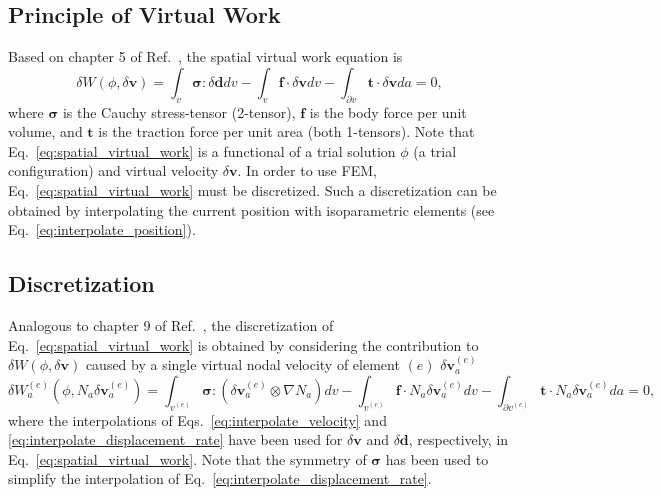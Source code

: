 \subsection{Principle of Virtual Work} 

Based on chapter 5 of Ref.\ \cite{JavierBonet:2008uxa}, the spatial virtual work equation is
%
\begin{equation}
\delta W(\phi,\delta \pmb{v}) = \int_v \pmb{\sigma}:\delta \pmb{d} dv - \int_v \pmb{f} \cdot \delta\pmb{v}dv - \int_{\partial v} \pmb{t} \cdot \delta \pmb{v} da = 0,
\label{eq:spatial_virtual_work}
\end{equation}
%
where $\pmb{\sigma}$ is the Cauchy stress-tensor (2-tensor), $\pmb{f}$ is the body force per unit volume, and $\pmb{t}$ is the traction force per unit area (both 1-tensors). Note that Eq.\ \eqref{eq:spatial_virtual_work} is a functional of a trial solution $\phi$ (a trial configuration) and virtual velocity $\delta \pmb{v}$. In order to use FEM, Eq.\ \eqref{eq:spatial_virtual_work} must be discretized. Such a discretization can be obtained by interpolating the current position with isoparametric elements (see Eq.\ \eqref{eq:interpolate_position}).

\subsection{Discretization}

Analogous to chapter 9 of Ref.\ \cite{JavierBonet:2008uxa}, the discretization of Eq.\ \eqref{eq:spatial_virtual_work} is obtained by considering the contribution to $\delta W(\phi,\delta \pmb{v})$ caused by a single virtual nodal velocity of element $(e)$ $\delta \pmb{v}^{(e)}_a$  
%
\begin{equation}
\delta W^{(e)}_a(\phi,N_a\delta\pmb{v}^{(e)}_a) = \int_{v^{(e)}} \pmb{\sigma}:(\delta \pmb{v}^{(e)}_a \otimes \nabla N_a) dv - \int_{v^{(e)}} \pmb{f} \cdot N_a \delta\pmb{v}^{(e)}_a dv - \int_{\partial v^{(e)}} \pmb{t} \cdot N_a \delta\pmb{v}^{(e)}_a da = 0,
\label{eq:discretized_virtual_work}
\end{equation}
%
where the interpolations of Eqs.\ \eqref{eq:interpolate_velocity} and \eqref{eq:interpolate_displacement_rate} have been used for $\delta \pmb{v}$ and $\delta \pmb{d}$, respectively, in Eq.\ \eqref{eq:spatial_virtual_work}. Note that the symmetry of $\pmb{\sigma}$ has been used to simplify the interpolation of Eq.\ \eqref{eq:interpolate_displacement_rate}. 


